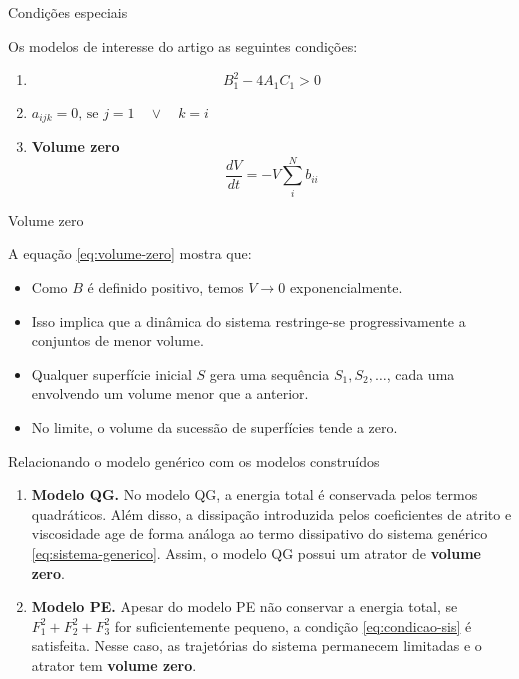 
\begin{frame}{Condições especiais}

Os modelos de interesse do artigo \cite{lorenz1980} as seguintes condições:
\begin{enumerate}
    \item \begin{equation*}
        B_1^2 - 4A_1C_1 > 0 \label{eq:condicao-sis}
    \end{equation*}
    \item $a_{ijk} = 0 \text{, se } j=1 \quad \vee \quad k = i$
    \item \textbf{Volume zero}
    \begin{equation}
        \frac{dV}{dt} = - V \sum_i^N b_{ii} \label{eq:volume-zero}
    \end{equation}
\end{enumerate}

\end{frame}



\begin{frame}{Volume zero}

A equação \eqref{eq:volume-zero} mostra que:
\begin{itemize}
    \item Como $B$ é definido positivo, temos $V \to 0$ exponencialmente.
    \item Isso implica que a dinâmica do sistema restringe-se progressivamente a conjuntos de menor volume.
    \item Qualquer superfície inicial $S$ gera uma sequência \( S_1, S_2, \dots \), cada uma envolvendo um volume menor que a anterior.
    \item No limite, o volume da sucessão de superfícies tende a zero.
\end{itemize}

\end{frame}


\begin{frame}{Relacionando o modelo genérico com os modelos construídos}

\begin{enumerate}
    \item \textbf{Modelo QG.} No modelo QG, a energia total é conservada pelos termos quadráticos. Além disso, a dissipação introduzida pelos coeficientes de atrito e viscosidade age de forma análoga ao termo dissipativo do sistema genérico \eqref{eq:sistema-generico}. Assim, o modelo QG possui um atrator de \textbf{volume zero}.
    
    \item \textbf{Modelo PE.} Apesar do modelo PE não conservar a energia total, se \( F_1^2 +F_2^2+F_3^2 \) for suficientemente pequeno, a condição \eqref{eq:condicao-sis} é satisfeita. Nesse caso, as trajetórias do sistema permanecem limitadas e o atrator tem \textbf{volume zero}.
\end{enumerate}

\end{frame}

